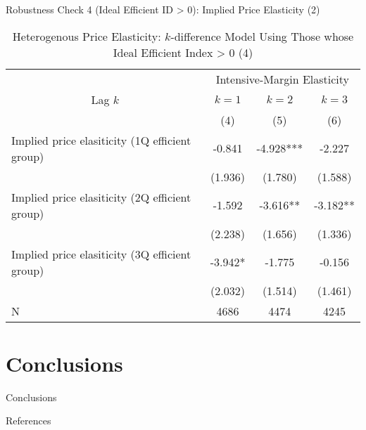 \documentclass[
  ignorenonframetext,
]{beamer}
\begin{document}
\begin{frame}{Robustness Check 4 (Ideal Efficient ID \textgreater{} 0): Implied Price Elasticity (2)}
\protect\hypertarget{robustness-check-4-ideal-efficient-id-0-implied-price-elasticity-2}{}
\begin{table}

\caption{\label{tab:kableSubsetHeterokDiffElasticitySlide4}Heterogenous Price Elasticity: $k$-difference Model Using Those whose Ideal Efficient Index > 0 (4)}
\centering
\fontsize{8}{10}\selectfont
\begin{tabular}[t]{lccc}
\toprule
\multicolumn{1}{c}{ } & \multicolumn{3}{c}{Intensive-Margin Elasticity} \\
\cmidrule(l{3pt}r{3pt}){2-4}
\multicolumn{1}{c}{Lag $k$} & \multicolumn{1}{c}{$k = 1$} & \multicolumn{1}{c}{$k = 2$} & \multicolumn{1}{c}{$k = 3$} \\
\cmidrule(l{3pt}r{3pt}){1-1} \cmidrule(l{3pt}r{3pt}){2-2} \cmidrule(l{3pt}r{3pt}){3-3} \cmidrule(l{3pt}r{3pt}){4-4}
 & (4) & (5) & (6)\\
\midrule
Implied price elasiticity (1Q efficient group) & -0.841 & -4.928*** & -2.227\\
 & (1.936) & (1.780) & (1.588)\\
Implied price elasiticity (2Q efficient group) & -1.592 & -3.616** & -3.182**\\
 & (2.238) & (1.656) & (1.336)\\
Implied price elasiticity (3Q efficient group) & -3.942* & -1.775 & -0.156\\
 & (2.032) & (1.514) & (1.461)\\
N & 4686 & 4474 & 4245\\
\bottomrule
\end{tabular}
\end{table}
\end{frame}

\hypertarget{conclusions}{%
\section{Conclusions}\label{conclusions}}

\begin{frame}{Conclusions}
\end{frame}

\begin{frame}[allowframebreaks]{References}
\protect\hypertarget{references}{}
\end{frame}
\end{document}
